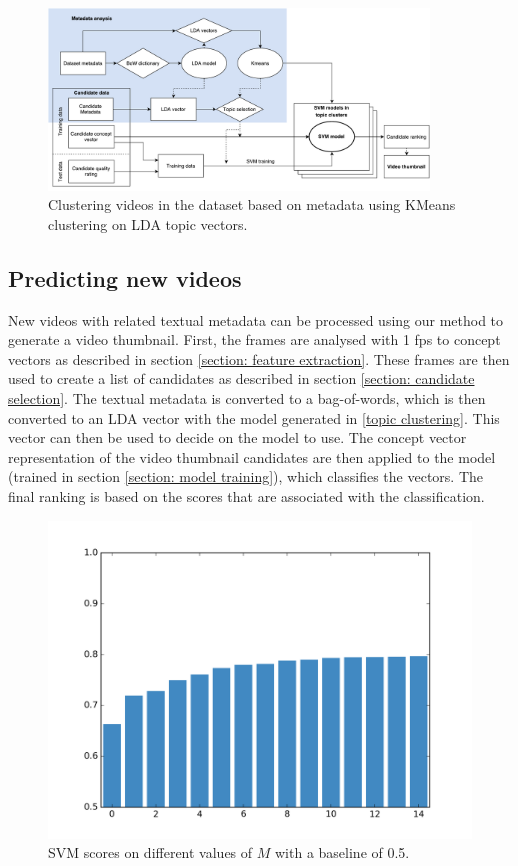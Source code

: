\documentclass{../resources/sig-alternate-05-2015}
\begin{document}
\begin{figure}[tb!]
	\centering
	\includegraphics[width=0.9\textwidth]{resources/topic-clustering}
	\caption{Clustering videos in the dataset based on metadata using KMeans clustering on LDA topic vectors.}
	\label{figure: topic clustering scheme}
\end{figure}

\subsection{Predicting new videos}

New videos with related textual metadata can be processed using our method to generate a video thumbnail. First, the frames are analysed with 1 fps to concept vectors as described in section \ref{section: feature extraction}. These frames are then used to create a list of candidates as described in section \ref{section: candidate selection}. The textual metadata is converted to a bag-of-words, which is then converted to an LDA vector with the model generated in \ref{topic clustering}. This vector can then be used to decide on the model to use. The concept vector representation of the video thumbnail candidates are then applied to the model (trained in section \ref{section: model training}), which classifies the vectors. The final ranking is based on the scores that are associated with the classification.


\begin{figure}[h]
	\centering
	\includegraphics[width=\linewidth]{resources/svm-accuracy}
	\caption{SVM scores on different values of $M$ with a baseline of 0.5.}
	\label{figure: svm accuracy with k}
\end{figure}
\end{document}
